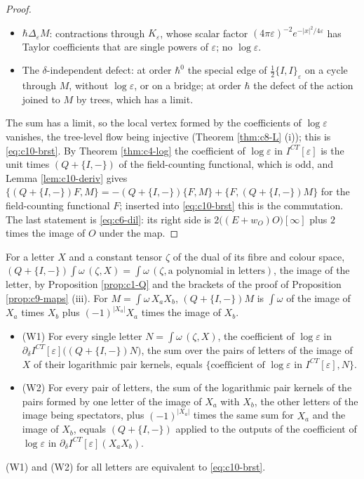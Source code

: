 \begin{proof}
\begin{itemize}
\item $\hbar\Delta_\varepsilon M$: contractions through $K_\varepsilon$, whose scalar factor $(4\pi\varepsilon)^{-2}e^{-|x|^2/4\varepsilon}$ has Taylor coefficients that are single powers of $\varepsilon$; no $\log\varepsilon$.
\item The $\delta$-independent defect: at order $\hbar^0$ the special edge of $\tfrac12\{I,I\}_\varepsilon$ on a cycle through $M$, without $\log\varepsilon$, or on a bridge; at order $\hbar$ the defect of the action joined to $M$ by trees, which has a limit.
\end{itemize}
The sum has a limit, so the local vertex formed by the coefficients of $\log\varepsilon$ vanishes, the tree-level flow being injective (Theorem \ref{thm:c8-L} (i)); this is \eqref{eq:c10-brst}. By Theorem \ref{thm:c4-log} the coefficient of $\log\varepsilon$ in $I^{CT}[\varepsilon]$ is the unit times $(Q+\{I,-\})$ of the field-counting functional, which is odd, and Lemma \ref{lem:c10-deriv} gives $\{(Q+\{I,-\})F,M\}=-(Q+\{I,-\})\{F,M\}+\{F,(Q+\{I,-\})M\}$ for the field-counting functional $F$; inserted into \eqref{eq:c10-brst} this is the commutation. The last statement is \eqref{eq:c6-dil}: its right side is $2\big((E+w_O)O\big)[\infty]$ plus $2$ times the image of $O$ under the map.
\end{proof}

For a letter $X$ and a constant tensor $\zeta$ of the dual of its fibre and colour space, $(Q+\{I,-\})\int\omega\,(\zeta,X)=\int\omega\,(\zeta,\text{a polynomial in letters})$, the image of the letter, by Proposition \ref{prop:c1-Q} and the brackets of the proof of Proposition \ref{prop:c9-maps} (iii). For $M=\int\omega\,X_aX_b$, $(Q+\{I,-\})M$ is $\int\omega$ of the image of $X_a$ times $X_b$ plus $(-1)^{|X_a|}X_a$ times the image of $X_b$.

\begin{corollary}
\label{cor:c10-ward}
\begin{itemize}
\item (W1) For every single letter $N=\int\omega\,(\zeta,X)$, the coefficient of $\log\varepsilon$ in $\partial_\delta I^{CT}[\varepsilon]\big((Q+\{I,-\})N\big)$, the sum over the pairs of letters of the image of $X$ of their logarithmic pair kernels, equals $\{\text{coefficient of }\log\varepsilon\text{ in }I^{CT}[\varepsilon],N\}$.
\item (W2) For every pair of letters, the sum of the logarithmic pair kernels of the pairs formed by one letter of the image of $X_a$ with $X_b$, the other letters of the image being spectators, plus $(-1)^{|X_a|}$ times the same sum for $X_a$ and the image of $X_b$, equals $(Q+\{I,-\})$ applied to the outputs of the coefficient of $\log\varepsilon$ in $\partial_\delta I^{CT}[\varepsilon](X_aX_b)$.
\end{itemize}
(W1) and (W2) for all letters are equivalent to \eqref{eq:c10-brst}.
\end{corollary}

